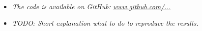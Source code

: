 \begin{itemize}
    \item \textit{The code is available on GitHub: \url{www.github.com/...}}
    \item \textit{TODO: Short explanation what to do to reproduce the results.}
\end{itemize}






